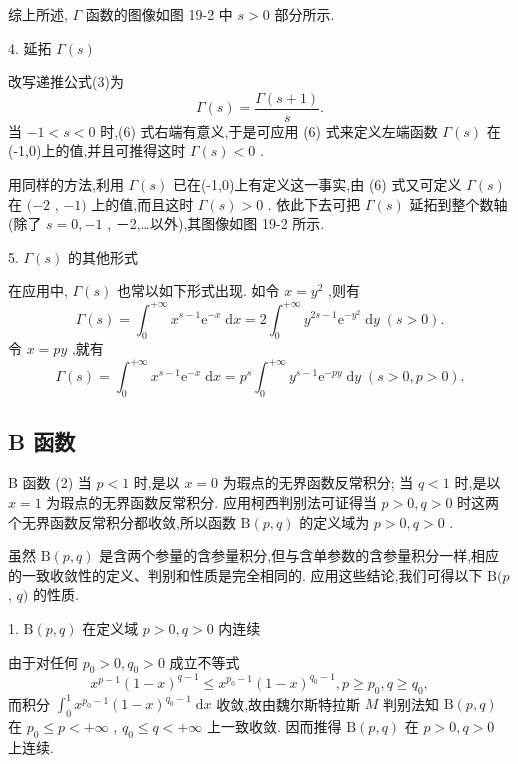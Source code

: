 综上所述, \(\Gamma\) 函数的图像如图 19-2 中 \(s > 0\) 部分所示.

4. 延拓 \(\Gamma \left( s\right)\)

改写递推公式(3)为
\[
\Gamma \left( s\right)  = \frac{\Gamma \left( {s + 1}\right) }{s}. \tag{6}
\]
当 \(- 1 < s < 0\) 时,(6) 式右端有意义,于是可应用 (6) 式来定义左端函数 \(\Gamma \left( s\right)\) 在(-1,0)上的值,并且可推得这时 \(\Gamma \left( s\right)  < 0\) .

用同样的方法,利用 \(\Gamma \left( s\right)\) 已在(-1,0)上有定义这一事实,由 (6) 式又可定义 \(\Gamma \left( s\right)\) 在 \(( - 2\) , \(- 1)\) 上的值,而且这时 \(\Gamma \left( s\right)  > 0\) . 依此下去可把 \(\Gamma \left( s\right)\) 延拓到整个数轴 (除了 \(s = 0, - 1\) , －2,…以外),其图像如图 19-2 所示.

5. \(\Gamma \left( s\right)\) 的其他形式

在应用中, \(\Gamma \left( s\right)\) 也常以如下形式出现. 如令 \(x = {y}^{2}\) ,则有
\[
\Gamma \left( s\right)  = {\int }_{0}^{+\infty }{x}^{s - 1}{\mathrm{e}}^{-x}\mathrm{\;d}x = 2{\int }_{0}^{+\infty }{y}^{{2s} - 1}{\mathrm{e}}^{-{y}^{2}}\mathrm{\;d}y\;\left( {s > 0}\right) . \tag{7}
\]
令 \(x = {py}\) ,就有
\[
\Gamma \left( s\right)  = {\int }_{0}^{+\infty }{x}^{s - 1}{\mathrm{e}}^{-x}\mathrm{\;d}x = {p}^{s}{\int }_{0}^{+\infty }{y}^{s - 1}{\mathrm{e}}^{-{py}}\mathrm{\;d}y\;\left( {s > 0,p > 0}\right) . \tag{8}
\]
\subsection{B 函数}

B 函数 (2) 当 \(p < 1\) 时,是以 \(x = 0\) 为瑕点的无界函数反常积分; 当 \(q < 1\) 时,是以 \(x = 1\) 为瑕点的无界函数反常积分. 应用柯西判别法可证得当 \(p > 0,q > 0\) 时这两个无界函数反常积分都收敛,所以函数 \(\mathrm{B}\left( {p,q}\right)\) 的定义域为 \(p > 0,q > 0\) .

虽然 \(\mathrm{B}\left( {p,q}\right)\) 是含两个参量的含参量积分,但与含单参数的含参量积分一样,相应的一致收敛性的定义、判别和性质是完全相同的. 应用这些结论,我们可得以下 \(\mathrm{B}(p\) , \(q)\) 的性质.

1. \(\mathrm{B}\left( {p,q}\right)\) 在定义域 \(p > 0,q > 0\) 内连续

由于对任何 \({p}_{0} > 0,{q}_{0} > 0\) 成立不等式
\[
{x}^{p - 1}{\left( 1 - x\right) }^{q - 1} \leq  {x}^{{p}_{0} - 1}{\left( 1 - x\right) }^{{q}_{0} - 1},p \geq  {p}_{0},q \geq  {q}_{0},
\]
而积分 \({\int }_{0}^{1}{x}^{{p}_{0} - 1}{\left( 1 - x\right) }^{{q}_{0} - 1}\mathrm{\;d}x\) 收敛,故由魏尔斯特拉斯 \(M\) 判别法知 \(\mathrm{B}\left( {p,q}\right)\) 在 \({p}_{0} \leq  p <  + \infty\) , \({q}_{0} \leq  q <  + \infty\) 上一致收敛. 因而推得 \(\mathrm{B}\left( {p,q}\right)\) 在 \(p > 0,q > 0\) 上连续.

